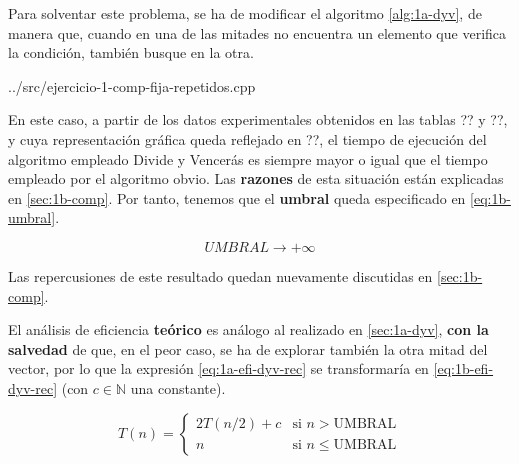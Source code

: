 Para solventar este problema, se ha de modificar el algoritmo \ref{alg:1a-dyv}, de manera que, cuando en una de las mitades
no encuentra un elemento que verifica la condición, también busque en la otra.






{../src/ejercicio-1-comp-fija-repetidos.cpp} 


En este caso, a partir de los datos experimentales obtenidos en las tablas ?? y ??, y cuya representación
gráfica queda reflejado en ??, el tiempo de ejecución del algoritmo empleado Divide y Vencerás
es siempre mayor o igual que el tiempo empleado por el algoritmo obvio. Las \textbf{razones} de esta situación están
explicadas en \ref{sec:1b-comp}. Por tanto, tenemos que el \textbf{umbral} queda especificado en \ref{eq:1b-umbral}. 

\begin{equation}
    \boxed{UMBRAL \rightarrow +\infty}
    \label{eq:1b-umbral}
\end{equation}


Las repercusiones de este resultado quedan nuevamente discutidas en \ref{sec:1b-comp}.


El análisis de eficiencia \textbf{teórico} es análogo al realizado en \ref{sec:1a-dyv}, \textbf{con la salvedad} de que, en el
peor caso, se ha de explorar también la otra mitad del vector, por lo que la expresión \ref{eq:1a-efi-dyv-rec}
se transformaría en \ref{eq:1b-efi-dyv-rec} (con $c \in \mathbb N$ una constante). 

\begin{equation}
    T(n) = \left\{ \begin{array}{lr} 2 T(n/2) + c & \text{si } n > \text{UMBRAL}\\ n & \text{si } n \leqslant \text{UMBRAL} \end{array} \right.
    \label{eq:1b-efi-dyv-rec}
\end{equation}

